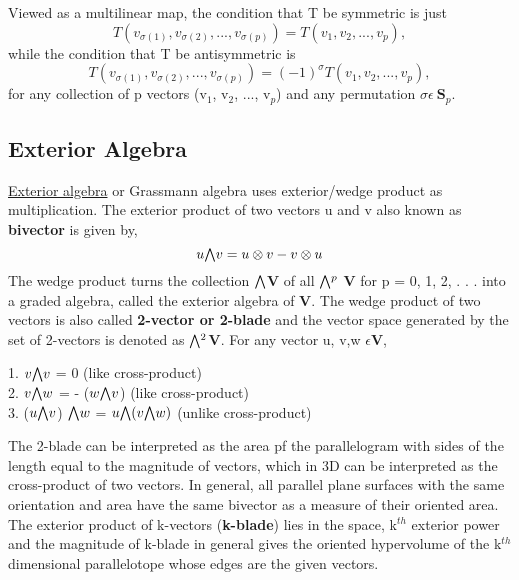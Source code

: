 Viewed as a multilinear map, the condition that T be symmetric is just
\begin{equation}
    T(v_{\sigma(1)}, v_{\sigma(2)} , . . . , v_{\sigma(p)} ) = T (v_1 , v_2 , . . . , v_p ),
\end{equation}
while the condition that T be antisymmetric is
\begin{equation}
    T(v_{\sigma(1)}, v_{\sigma(2)} , . . . , v_{\sigma(p)} ) = (-1)^{\sigma} T (v_1 , v_2 , . . . , v_p ),
\end{equation}
for any collection of p vectors (v$_1$, v$_2$, ..., v$_p$) and any permutation $\sigma \epsilon \: \textbf{S}_p$.

\subsection{Exterior Algebra}
\href{https://en.wikipedia.org/wiki/Exterior_algebra}{Exterior algebra} or Grassmann algebra uses exterior/wedge product
as multiplication. The exterior product of two vectors u and v also known as \textbf{bivector} is given by,
\begin{equation}
    u \exterior v = u \otimes v - v \otimes u
\end{equation}
The wedge product turns the collection $\exterior$\textbf{V} of all $\exterior^p$ \textbf{V} for p = 0, 1, 2, . . . into a
graded algebra, called the exterior algebra of \textbf{V}.
The wedge product of two vectors is also called \textbf{2-vector or 2-blade} and the vector space generated by the set
of 2-vectors is denoted as $\exterior^2$\textbf{V}. For any vector u, v,w $\epsilon \textbf{V}$,

1. $v \exterior v$ = 0 \hspace{2cm}(like cross-product) \\
2. $v \exterior w$ = - ($w \exterior v$) \hspace{2cm}(like cross-product) \\
3. ($u \exterior v$) $\exterior w$ = $  u \exterior (v \exterior w)$  \hspace{2cm}(unlike cross-product)

The 2-blade can be interpreted as the area pf the parallelogram with sides of the length equal to the
magnitude of vectors, which in 3D can be interpreted as the cross-product of two vectors.
In general, all parallel plane surfaces with the same orientation and area have the same bivector as a measure of their oriented area.
The exterior product of k-vectors (\textbf{k-blade}) lies in the space, k$^{th}$ exterior power and the magnitude of k-blade in general 
gives the oriented hypervolume of the k$^{th}$ dimensional parallelotope whose edges are the given vectors.

